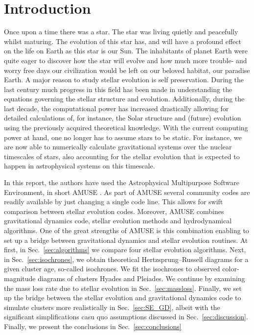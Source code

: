 \documentclass{aa}
\begin{document}

   \maketitle
%

\section{Introduction}
Once upon a time there was a star. The star was living quietly and peacefully whilst maturing. The evolution of this star has, and will have a profound effect on the life on Earth as this star is our Sun. The inhabitants of planet Earth were quite eager to discover how the star will evolve and how much more trouble- and worry free days our civilization would be left on our beloved habitat, our paradise Earth. A major reason to study stellar evolution is self preservation. During the last century much progress in this field has been made in understanding the equations governing the stellar structure and evolution. Additionally, during the last decade, the computational power has increased drastically allowing for detailed calculations of, for instance, the Solar structure and (future) evolution using the previously acquired theoretical knowledge. With the current computing power at hand, one no longer has to assume stars to be static. For instance, we are now able to numerically calculate gravitational systems over the nuclear timescales of stars, also accounting for the stellar evolution that is expected to happen in astrophysical systems on this timescale.

In this report, the authors have used the Astrophysical Multipurpose Software Environment, in short AMUSE \citep{2009NewA...14..369P, 2013CoPhC.183..456P, 2013A&A...557A..84P}. As part of AMUSE several community codes are readily available by just changing a single code line. This allows for swift comparison between stellar evolution codes. Moreover, AMUSE combines gravitational dynamics code, stellar evolution methods and hydrodynamical algorithms. One of the great strengths of AMUSE is this combination enabling to set up a bridge between gravitational dynamics and stellar evolution routines. At first, in Sec.~\ref{sec:algorithms} we compare four stellar evolution algorithms. Next, in Sec.~\ref{sec:isochrones}, we obtain theoretical Hertzsprung–Russell diagrams for a given cluster age, so-called isochrones. We fit the isochrones to observed color-magnitude diagrams of clusters Hyades and Pleiades. We continue by examining the mass loss rate due to stellar evolution in Sec.~\ref{sec:massloss}. Finally, we set up the bridge between the stellar evolution and gravitational dynamics code to simulate clusters more realistically in Sec.~\ref{sec:SE_GD}, albeit with the significant simplifications casu quo assumptions discussed in Sec.~\ref{sec:discussion}. Finally, we present the conclusions in Sec.~\ref{sec:conclusions}
\end{document}
